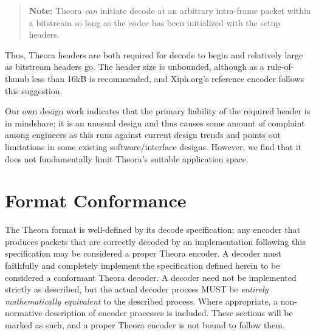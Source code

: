 \documentclass[9pt,letterpaper]{book}
\numberwithin{equation}{chapter}
\numberwithin{figure}{chapter}
\numberwithin{table}{chapter}
\begin{document}
\begin{verse}
{\bf Note:} Theora {\em can} initiate decode at an arbitrary intra-frame packet
 within a bitstream so long as the codec has been initialized with the setup
 headers.
\end{verse}

Thus, Theora headers are both required for decode to begin and relatively large
 as bitstream headers go.
The header size is unbounded, although as a rule-of-thumb less than 16kB is
 recommended, and Xiph.org's reference encoder follows this suggestion.

Our own design work indicates that the primary liability of the required header
 is in mindshare; it is an unusual design and thus causes some amount of
 complaint among engineers as this runs against current design trends and
 points out limitations in some existing software/interface designs.
However, we find that it does not fundamentally limit Theora's suitable
 application space.

\section{Format Conformance}

The Theora format is well-defined by its decode specification; any encoder that
 produces packets that are correctly decoded by an implementation following
 this specification may be considered a proper Theora encoder.
A decoder must faithfully and completely implement the specification defined
 herein %
 to be considered a conformant Theora decoder.
A decoder need not be implemented strictly as described, but the
 actual decoder process MUST be {\em entirely mathematically equivalent}
 to the described process.
Where appropriate, a non-normative description of encoder processes is
 included.
These sections will be marked as such, and a proper Theora encoder is not
 bound to follow them.

\end{document}
